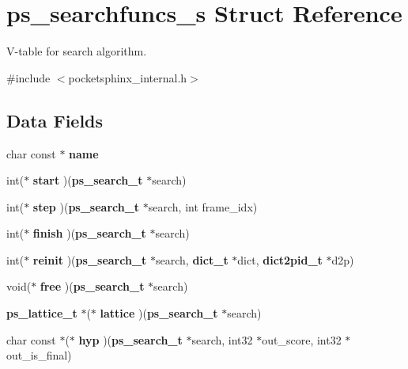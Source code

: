\section{ps\-\_\-searchfuncs\-\_\-s Struct Reference}
\label{structps__searchfuncs__s}


V-\/table for search algorithm.  




{\ttfamily \#include $<$pocketsphinx\-\_\-internal.\-h$>$}

\subsection*{Data Fields}
\begin{DoxyCompactItemize}
\item 
char const $\ast$ {\bfseries name}\label{structps__searchfuncs__s_a0a227b1bbc134ced7d7980bc873d39d6}

\item 
int($\ast$ {\bfseries start} )({\bf ps\-\_\-search\-\_\-t} $\ast$search)\label{structps__searchfuncs__s_a74ab853abe9f12ce016c5e92e10f0fe2}

\item 
int($\ast$ {\bfseries step} )({\bf ps\-\_\-search\-\_\-t} $\ast$search, int frame\-\_\-idx)\label{structps__searchfuncs__s_a7c92cba8683e766c1d4988118fc883f7}

\item 
int($\ast$ {\bfseries finish} )({\bf ps\-\_\-search\-\_\-t} $\ast$search)\label{structps__searchfuncs__s_a20a8de3b54011ce526e1a80ad42bb7c4}

\item 
int($\ast$ {\bfseries reinit} )({\bf ps\-\_\-search\-\_\-t} $\ast$search, {\bf dict\-\_\-t} $\ast$dict, {\bf dict2pid\-\_\-t} $\ast$d2p)\label{structps__searchfuncs__s_ac72f755ca7e66ee559a117982cf1a374}

\item 
void($\ast$ {\bfseries free} )({\bf ps\-\_\-search\-\_\-t} $\ast$search)\label{structps__searchfuncs__s_ad1f76bab9eede4b2fd1dd0e65bd6c60b}

\item 
{\bf ps\-\_\-lattice\-\_\-t} $\ast$($\ast$ {\bfseries lattice} )({\bf ps\-\_\-search\-\_\-t} $\ast$search)\label{structps__searchfuncs__s_aeaeebdd2e5852aef04a25eb2291139e1}

\item 
char const $\ast$($\ast$ {\bfseries hyp} )({\bf ps\-\_\-search\-\_\-t} $\ast$search, int32 $\ast$out\-\_\-score, int32 $\ast$out\-\_\-is\-\_\-final)\label{structps__searchfuncs__s_ab35d758b994ad40cc693d1015552c3a2}


\end{DoxyCompactItemize}
